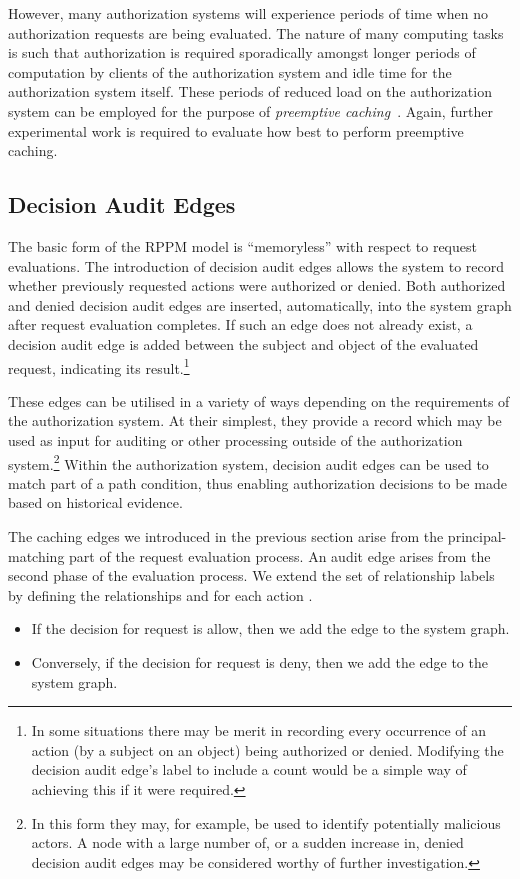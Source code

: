 \documentclass{article}
\begin{document}
However, many authorization systems will experience periods of time when no authorization requests are being evaluated.
The nature of many computing tasks is such that authorization is required sporadically amongst longer periods of computation by clients of the authorization system and idle time for the authorization system itself.
These periods of reduced load on the authorization system can be employed for the purpose of \emph{preemptive caching}~\cite{CramptonS14_STM}.
Again, further experimental work is required to evaluate how best to perform preemptive caching.

\subsection{Decision Audit Edges}\label{sec:extended_typed_edges:decision_audit_edges}
The basic form of the RPPM model is ``memoryless'' with respect to request evaluations.
The introduction of decision audit edges allows the system to record whether previously requested actions were authorized or denied.
Both authorized and denied decision audit edges are inserted, automatically, into the system graph after request evaluation completes.
If such an edge does not already exist, a decision audit edge is added between the subject and object of the evaluated request, indicating its result.\footnote{In some situations there may be merit in recording every occurrence of an action (by a subject on an object) being authorized or denied. Modifying the decision audit edge's label to include a count would be a simple way of achieving this if it were required.}

These edges can be utilised in a variety of ways depending on the requirements of the authorization system.
At their simplest, they provide a record which may be used as input for auditing or other processing outside of the authorization system.\footnote{In this form they may, for example, be used to identify potentially malicious actors.
A node with a large number of, or a sudden increase in, denied decision audit edges may be considered worthy of further investigation.}
Within the authorization system, decision audit edges can be used to match part of a path condition, thus enabling authorization decisions to be made based on historical evidence.

The caching edges we introduced in the previous section arise from the principal-matching part of the request evaluation process.
An audit edge arises from the second phase of the evaluation process.
We extend the set of relationship labels by defining the relationships   and  for each action .
\begin{itemize}
 \item If the decision for request  is allow, then we add the edge  to the system graph.
 \item Conversely, if the decision for request  is deny, then we add the edge  to the system graph.
\end{itemize}
\end{document}
